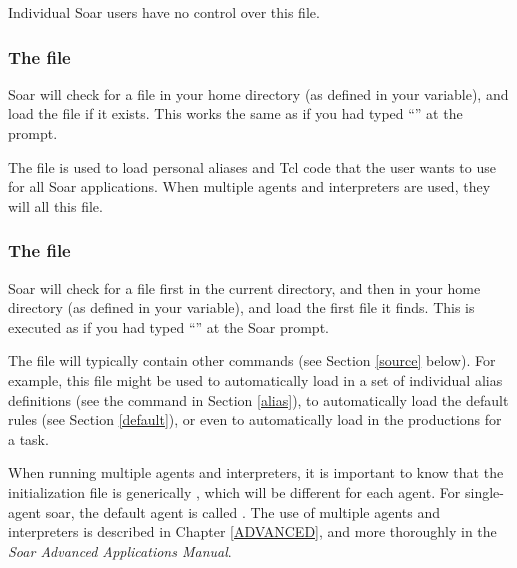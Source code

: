 {Individual Soar users have no control over this file.


\subsubsection*{The  file}


Soar will check for a  file in your home directory (as defined
in your  variable), and load the file if it exists. This works
the same as if you had typed ``'' at the prompt.

The  file is used to load personal aliases and Tcl code that
the user wants to use for all Soar applications. When multiple agents and
interpreters are used, they will all  this file.



\subsubsection*{The  file}

Soar will check for a  file first in the current directory,
and then in your home directory (as defined in your  variable),
and load the first  file it finds. This is executed 
as if you had typed ``'' at the Soar prompt.


The  file will typically contain other  commands
(see Section \ref{source} below). For example, this file might be used to
automatically load in a set of individual alias definitions (see the
 command in Section \ref{alias}), to automatically load the
default rules (see Section \ref{default}), or even to automatically load in
the productions for a task.

When running multiple agents and interpreters, it is important to know that
the  initialization file is generically
, which will be different for each agent. For
single-agent soar, the default agent is called . The use of
multiple agents and interpreters is described in Chapter \ref{ADVANCED}, and
more thoroughly in the \textit{Soar Advanced Applications Manual}.


}
